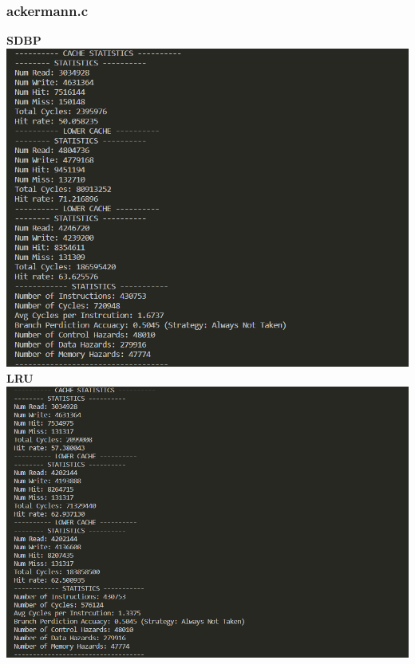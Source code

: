 \documentclass{article}
\begin{document}
\subsubsection{ackermann.c}
\textbf{SDBP}\\
\includegraphics[scale = 0.25]{LDBP ackerman.png}\\
\textbf{LRU}\\
\includegraphics[scale = 0.25]{LRU achker.png}\\
\end{document}
